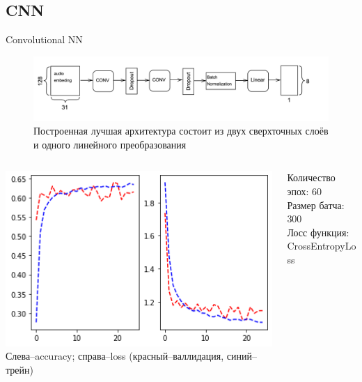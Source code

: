 \documentclass[c, aspectratio = 43]{beamer}
\begin{document}
\subsection{CNN}

    \begin{frame}{Convolutional NN}
        \begin{figure}[h]
            \includegraphics[width=1\linewidth]{CNN.png}
            Построенная лучшая архитектура состоит из двух сверхточных слоёв и одного линейного преобразования
        \end{figure}

        \begin{columns}
            \begin{column}{0.5\textwidth}  %
                \begin{center}
                    \includegraphics[width=1\textwidth]{CNN_testandval.png}
                    \tiny Слева--accuracy; справа--loss (красный--валлидация, синий--трейн)
                \end{center}
            \end{column}
            \begin{column}{0.5\textwidth}
                Количество эпох: 60 \\
                Размер батча: 300\\
                Лосс функция: CrossEntropyLoss\\


\end{column}
\end{columns}
\end{frame}
\end{document}

